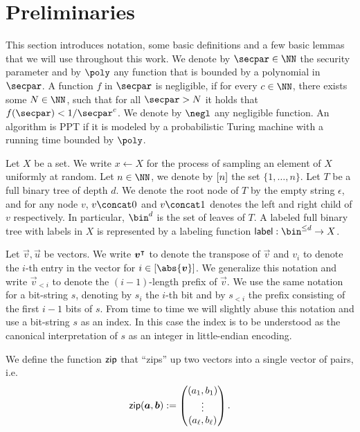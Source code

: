 \section{Preliminaries}\label{sec:prelim}
This section introduces notation, some basic definitions and a few basic lemmas that we will use throughout this work.
We denote by $\secpar\in\NN$ the security parameter and by $\poly$ any function that is bounded by a polynomial in $\secpar$.
A function $f$ in $\secpar$ is negligible, if for every $c \in \NN$, there exists some $N\in\NN$, such that for all $\secpar>N$ it holds that $f(\secpar) < 1/\secpar^c$.
We denote by $\negl$ any negligible function.
An algorithm is PPT if it is modeled by a probabilistic Turing machine with a running time bounded by $\poly$.

Let $X$ be a set.
We write $x\gets X$ for the process of sampling an element of $X$ uniformly at random.
Let $n\in\NN$, we denote by $[n]$ the set $\{1,\dots,n\}$.
Let $T$ be a full binary tree of depth $d$.
We denote the root node of $T$ by the empty string $\epsilon$, and for any node $v$, $v\concat 0$ and $v\concat 1$ denotes the left and right child of $v$ respectively.
In particular, $\bin^d$ is the set of leaves of $T$.
A labeled full binary tree with labels in $X$ is represented by a labeling function $\lbl : \bin^{\leq d} \to X$.

Let $\vec{v},\vec{u}$ be vectors.
We write $\boldsymbol{v}^\intercal$ to denote the transpose of $\vec{v}$ and $v_i$ to denote the $i$-th entry in the vector for $i\in\interval{\abs{\vec{v}}}$.
We generalize this notation and write $\vec{v}_{< i}$ to denote the $(i-1)$-length prefix of $\vec{v}$.
We use the same notation for a bit-string $s$, denoting by $s_i$ the $i$-th bit and by $s_{<i}$ the prefix consisting of the first $i-1$ bits of $s$.
From time to time we will slightly abuse this notation and use a bit-string $s$ as an index.
In this case the index is to be understood as the canonical interpretation of $s$ as an integer in little-endian encoding.

We define the function $\mathsf{zip}$ that \enquote{zips} up two vectors into a single vector of pairs, i.e.
\[
\mathsf{zip}(\boldsymbol{a},\boldsymbol{b}) := \begin{pmatrix}(a_1,b_1)\\
\vdots\\
(a_\ell,b_\ell) \end{pmatrix}.
\]


